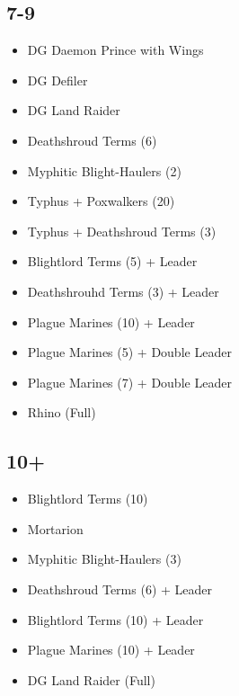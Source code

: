 \documentclass{HordeModeTarot}
\begin{document}
\begin{multicols}{2}
\subsection*{7-9}

\begin{itemize}[leftmargin=*]
\item[] DG Daemon Prince with Wings
\item[] DG Defiler
\item[] DG Land Raider
\item[] Deathshroud Terms (6)
\item[] Myphitic Blight-Haulers (2)
\item[] Typhus + Poxwalkers (20)
\item[] Typhus + Deathshroud Terms (3)
\item[] Blightlord Terms (5) + Leader
\item[] Deathshrouhd Terms (3) + Leader
\item[] Plague Marines (10) + Leader
\item[] Plague Marines (5) + Double Leader
\item[] Plague Marines (7) + Double Leader
\item[] Rhino (Full)
\end{itemize}

\subsection*{10+}

\begin{itemize}[leftmargin=*]
\item[] Blightlord Terms (10)
\item[] Mortarion
\item[] Myphitic Blight-Haulers (3)
\item[] Deathshroud Terms (6) + Leader
\item[] Blightlord Terms (10) + Leader
\item[] Plague Marines (10) + Leader
\item[] DG Land Raider (Full)
\end{itemize}


\end{multicols}
\end{document}
